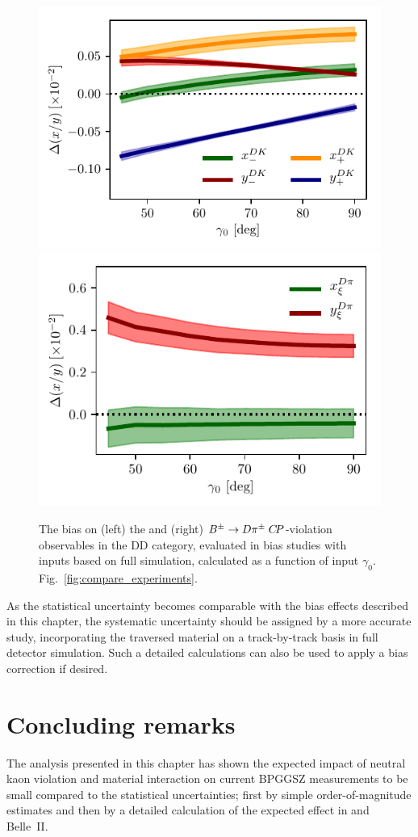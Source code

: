 \begin{figure}[tb]
  \centering
  \includegraphics[width=0.45\columnwidth]{figures/ks_chapter/delta_xy_dk.pdf}
  \includegraphics[width=0.45\columnwidth]{figures/ks_chapter/delta_xy_dpi.pdf}
  \caption{The bias on (left) the \BtoDK and (right) ${{{B}^\pm}\rightarrow{\ensuremath{D}}{\ensuremath{{\pi}^\pm}}} \;{C\!P}$-violation observables in the \lhcb DD category, evaluated in bias studies with inputs based on full \lhcb simulation, calculated as a function of input $\gamma_0$.  Fig.~\ref{fig:compare_experiments}.}
  \label{fig:LHCb_related_biases}
\end{figure}

As the statistical uncertainty becomes comparable with the bias effects described in this chapter, the systematic uncertainty should be assigned by a more accurate study, incorporating the traversed material on a track-by-track basis in full detector simulation. Such a detailed calculations can also be used to apply a bias correction if desired. 


\section{Concluding remarks} %
\label{sec:concluding_remarks}



The analysis presented in this chapter has shown the expected impact of neutral kaon \CP violation and material interaction on current BPGGSZ measurements to be small compared to the statistical uncertainties; first by simple order-of-magnitude estimates and then by a detailed calculation of the expected effect in \lhcb and Belle~II.




